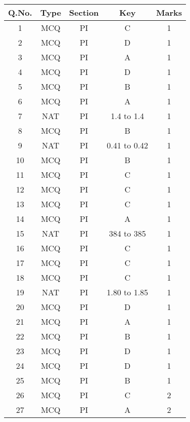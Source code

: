 \begin{table}
\begin{center}
\begin{tabular}{|c|c|c|c|c|}
\hline
\textbf{Q.No.} & \textbf{Type} & \textbf{Section} & \textbf{Key} & \textbf{Marks} \\
\hline
1  & MCQ & PI & C                & 1 \\ \hline
2  & MCQ & PI & D                & 1 \\ \hline
3  & MCQ & PI & A                & 1 \\ \hline
4  & MCQ & PI & D                & 1 \\ \hline
5  & MCQ & PI & B                & 1 \\ \hline
6  & MCQ & PI & A                & 1 \\ \hline
7  & NAT & PI & 1.4 to 1.4       & 1 \\ \hline
8  & MCQ & PI & B                & 1 \\ \hline
9  & NAT & PI & 0.41 to 0.42     & 1 \\ \hline
10 & MCQ & PI & B                & 1 \\ \hline
11 & MCQ & PI & C                & 1 \\ \hline
12 & MCQ & PI & C                & 1 \\ \hline
13 & MCQ & PI & C                & 1 \\ \hline
14 & MCQ & PI & A                & 1 \\ \hline
15 & NAT & PI & 384 to 385       & 1 \\ \hline
16 & MCQ & PI & C                & 1 \\ \hline
17 & MCQ & PI & C                & 1 \\ \hline
18 & MCQ & PI & C                & 1 \\ \hline
19 & NAT & PI & 1.80 to 1.85     & 1 \\ \hline
20 & MCQ & PI & D                & 1 \\ \hline
21 & MCQ & PI & A                & 1 \\ \hline
22 & MCQ & PI & B                & 1 \\ \hline
23 & MCQ & PI & D                & 1 \\ \hline
24 & MCQ & PI & D                & 1 \\ \hline
25 & MCQ & PI & B                & 1 \\ \hline
26 & MCQ & PI & C                & 2 \\ \hline
27 & MCQ & PI & A                & 2 \\ \hline

\end{tabular}
\end{center}
\end{table}
